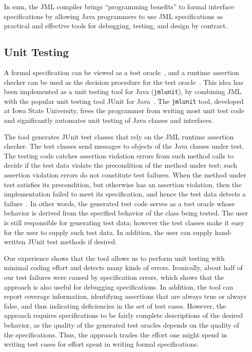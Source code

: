 \documentclass{entcs}
\begin{document}
In sum, the JML compiler brings ``programming benefits'' to formal
interface specifications by allowing Java programmers to use JML
specifications as practical and effective tools for debugging,
testing, and design by contract.

\subsection{Unit Testing}
\label{jmlunit}

A formal specification can be viewed as a test
oracle~\cite{Peters-Parnas98,Antoy-Hamlet00}, and a runtime assertion
checker can be used as the decision procedure for the test
oracle~\cite{Cheon-Leavens02}.  This idea has been implemented as a
unit testing tool for Java (\texttt{jmlunit}), by combining JML with
the popular unit testing tool JUnit for Java~\cite{Beck-Gamma98}.  The
\texttt{jmlunit} tool, developed at Iowa State University, frees the
programmer from writing most unit test code and significantly
automates unit testing of Java classes and interfaces.

The tool generates JUnit test classes that rely on the JML runtime
assertion checker.  The test classes send messages to objects of the
Java classes under test.  The testing code catches assertion violation
errors from such method calls to decide if the test data violate the
precondition of the method under test; such assertion violation errors
do not constitute test failures.  When the method under test satisfies
its precondition, but otherwise has an assertion violation, then the
implementation failed to meet its specification, and hence the test
data detects a failure~\cite{Cheon-Leavens02}.  In other words, the
generated test code serves as a test oracle whose behavior is derived
from the specified behavior of the class being tested.  The user is
still responsible for generating test data; however the test classes
make it easy for the user to supply such test data. In addition, the
user can supply hand-written JUnit test methods if desired.

Our experience shows that the tool allows us to perform unit testing
with minimal coding effort and detects many kinds of errors.
Ironically, about half of our test failures were caused by
specification errors, which shows that the approach is also useful for
debugging specifications.  In addition, the tool can report coverage
information, identifying assertions that are always true or always
false, and thus indicating deficiencies in the set of test cases.
However, the approach requires specifications to be fairly complete
descriptions of the desired behavior, as the quality of the generated
test oracles depends on the quality of the specifications. Thus, the
approach trades the effort one might spend in writing test cases for
effort spent in writing formal specifications.
\end{document}
